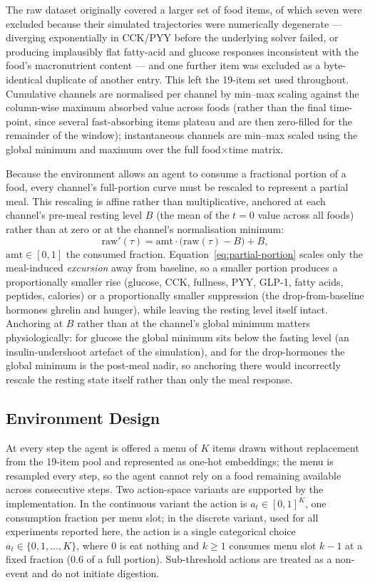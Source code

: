 \documentclass[10pt,twocolumn]{article}
\begin{document}
The raw dataset originally covered a larger set of food items, of which seven were excluded because their simulated trajectories were numerically degenerate — diverging exponentially in CCK/PYY before the underlying solver failed, or producing implausibly flat fatty-acid and glucose responses inconsistent with the food's macronutrient content — and one further item was excluded as a byte-identical duplicate of another entry. This left the 19-item set used throughout. Cumulative channels are normalised per channel by min–max scaling against the column-wise maximum absorbed value across foods (rather than the final time-point, since several fast-absorbing items plateau and are then zero-filled for the remainder of the window); instantaneous channels are min–max scaled using the global minimum and maximum over the full food$\times$time matrix.

Because the environment allows an agent to consume a fractional portion of a food, every channel's full-portion curve must be rescaled to represent a partial meal. This rescaling is affine rather than multiplicative, anchored at each channel's pre-meal resting level $B$ (the mean of the $t{=}0$ value across all foods) rather than at zero or at the channel's normalisation minimum:
\begin{equation}
\text{raw}'(\tau) = \text{amt}\cdot\big(\text{raw}(\tau)-B\big) + B,
\label{eq:partial-portion}
\end{equation}
$\text{amt}\in[0,1]$ the consumed fraction. Equation~\eqref{eq:partial-portion} scales only the meal-induced \emph{excursion} away from baseline, so a smaller portion produces a proportionally smaller rise (glucose, CCK, fullness, PYY, GLP-1, fatty acids, peptides, calories) or a proportionally smaller suppression (the drop-from-baseline hormones ghrelin and hunger), while leaving the resting level itself intact. Anchoring at $B$ rather than at the channel's global minimum matters physiologically: for glucose the global minimum sits below the fasting level (an insulin-undershoot artefact of the simulation), and for the drop-hormones the global minimum is the post-meal nadir, so anchoring there would incorrectly rescale the resting state itself rather than only the meal response.

\subsection{Environment Design}
\label{sec:env-design}

At every step the agent is offered a menu of $K$ items drawn without replacement from the 19-item pool and represented as one-hot embeddings; the menu is resampled every step, so the agent cannot rely on a food remaining available across consecutive steps. Two action-space variants are supported by the implementation. In the continuous variant the action is $a_t\in[0,1]^K$, one consumption fraction per menu slot; in the discrete variant, used for all experiments reported here, the action is a single categorical choice $a_t\in\{0,1,\dots,K\}$, where $0$ is eat nothing and $k\!\geq\!1$ consumes menu slot $k{-}1$ at a fixed fraction (0.6 of a full portion). Sub-threshold actions are treated as a non-event and do not initiate digestion.
\end{document}
